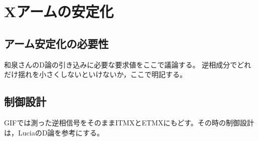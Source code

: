 \section{Xアームの安定化}
\subsection{アーム安定化の必要性}

和泉さんのD論の引き込みに必要な要求値をここで議論する。
逆相成分でどれだけ揺れを小さくしないといけないか，ここで明記する。


\subsection{制御設計}

GIFでは測った逆相信号をそのままITMXとETMXにもどす。その時の制御設計は，LuciaのD論を参考にする。
